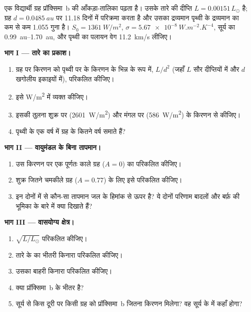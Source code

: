 \begin{problem}
\label{pb:g10:habitable-planet:1}
एक विद्यार्थी ग्रह प्रॉक्सिमा~b की आँकड़ा-तालिका पढ़ता है। उसके तारे की
दीप्ति $L = 0.00151\,L_\odot$ है; ग्रह $d = \qty{0.0485}{au}$ पर
11.18 दिनों में परिक्रमा करता है और उसका द्रव्यमान पृथ्वी के द्रव्यमान का कम से कम 1.055 गुना
है। $S_0 = \qty{1361}{W/m^2}$, $\sigma = \qty{5.67e-8}{W.m^{-2}.K^{-4}}$,
सूर्य का  \qtyrange{0.99}{1.70}{au}, और पृथ्वी का पलायन वेग
\qty{11.2}{km/s} लीजिए।

\medskip
\noindent\textbf{भाग I --- तारे का प्रकाश।}
\begin{enumerate}
  \item ग्रह पर किरणन को पृथ्वी पर के किरणन के भिन्न के रूप में,
        $L/d^2$ (जहाँ $L$ सौर दीप्तियों में और $d$ खगोलीय इकाइयों में), परिकलित कीजिए।
  \item इसे \unit{W/m^2} में व्यक्त कीजिए।
  \item इसकी तुलना शुक्र पर (\qty{2601}{W/m^2}) और
        मंगल पर (\qty{586}{W/m^2}) के किरणन से कीजिए।
  \item पृथ्वी के एक वर्ष में ग्रह के कितने वर्ष समाते हैं?
\end{enumerate}

\medskip
\noindent\textbf{भाग II --- वायुमंडल के बिना तापमान।}
\begin{enumerate}[resume]
  \item उस किरणन पर एक पूर्णतः काले ग्रह
        ($A = 0$) का  परिकलित कीजिए।
  \item शुक्र जितने चमकीले ग्रह ($A = 0.77$) के लिए इसे परिकलित कीजिए।
  \item इन दोनों में से कौन-सा तापमान जल के हिमांक से ऊपर है? ये दोनों परिणाम
        बादलों और बर्फ़ की भूमिका के बारे में क्या दिखाते
        हैं?
\end{enumerate}

\medskip
\noindent\textbf{भाग III --- वासयोग्य क्षेत्र।}
\begin{enumerate}[resume]
  \item $\sqrt{L/L_\odot}$ परिकलित कीजिए।
  \item तारे के  का भीतरी किनारा परिकलित कीजिए।
  \item उसका बाहरी किनारा परिकलित कीजिए।
  \item क्या प्रॉक्सिमा~b  के भीतर है?
  \item सूर्य से किस दूरी पर किसी ग्रह को प्रॉक्सिमा~b जितना किरणन मिलेगा? वह सूर्य
        के  में कहाँ
        होगा?
\end{enumerate}


\end{problem}
